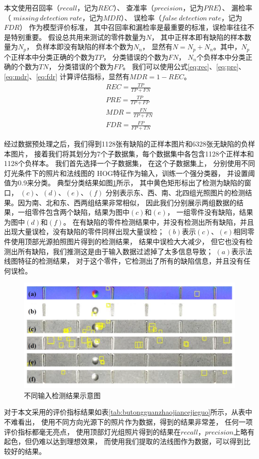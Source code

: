 本文使用召回率（$recall$，记为$REC$）、
查准率（$precision$，记为$PRE$）、
漏检率（ $missing~detection~rate$，记为$MDR$）、
误检率（$false~detection~rate$，记为$FDR$）
作为模型评价标准，
其中召回率和漏检率是最重要的标准，误检率往往不是特别重要。
假设总共用来测试的零件数量为$N$，
其中正样本即有缺陷的样本数量为$N_p$，
负样本即没有缺陷的样本个数为$N_n$，
显然有$N=N_p+N_n$。其中，$N_p$个正样本中分类正确的个数为$TP$，
分类错误的个数为$FN$，
$N_n$个负样本中分类正确的个数为$TN$，
分类错误的个数为$FP$。
我们可以使用公式\eqref{eq:rec}、\eqref{eq:pre}、\eqref{eq:mdr}、\eqref{eq:fdr}
计算评估指标，显然有$MDR=1-REC$。
\begin{gather}
REC=\frac{TP}{TP+FN}\label{eq:rec}\\
PRE=\frac{TP}{TP+FP}\label{eq:pre}\\
MDR=\frac{FN}{TP+FN}\label{eq:mdr}\\
FDR=\frac{FP}{FP+TN}\label{eq:fdr}
\end{gather}

经过数据预处理之后，我们得到1128张有缺陷的正样本图片和6328张无缺陷的负样本图片，
接着我们将其划分为7个子数据集，每个数据集中各包含1128个正样本和1128个负样本。
我们首先选择一个子数据集，
在这个子数据集上，
分别使用不同灯光条件下的照片和法线图的
HOG特征作为输入，训练一个强分类器，
并设置阈值为0.9来分类。
典型分类结果如图\ref{fig:chuantongjiancejieguo}所示，
其中黄色矩形标出了检测为缺陷的窗口，
$(c)$、$(d)$、$(e)$、$(f)$
分别表示东、西、南、北四组光照图片的检测结果。因为南、北和东、西两组结果非常相似，
因此我们分别展示两组数据的结果，一组零件包含两个缺陷，结果为图中$(c)$和$(e)$，
一组零件没有缺陷，结果为图中$(d)$和$(f)$。
在有缺陷的零件检测结果中，并没有检测出所有缺陷，并且出现大量误检，没有缺陷的零件同样出现大量误检；
$(b)$表示$(c)$、$(e)$相同零件使用顶部光源拍照图片得到的检测结果，
结果中误检大大减少，
但它也没有检测出所有缺陷，我们推测这是由于输入数据过滤掉了太多信息导致；
$(a)$表示法线图特征的检测结果，
对于这个零件，它检测出了所有的缺陷信息，并且没有任何误检。
\begin{figure}[htbp]
\centering
\includegraphics[width=1.0\linewidth]{figures/chuantongjiancejieguo.png}
\caption{不同输入检测结果示意图}
\label{fig:chuantongjiancejieguo}
\end{figure}
对于本文采用的评价指标结果如表\ref{tab:butongguanzhaojiancejieguo}所示，从表中不难看出，
使用不同方向光源下的照片作为数据，得到的结果非常差，
任何一项评价指标都毫无亮点，
使用顶部灯光组照片得到的结果在$recall$，$precision$上略有起色，但仍难以达到理想效果，
而使用我们提取的法线图作为数据，可以得到比较好的结果。

